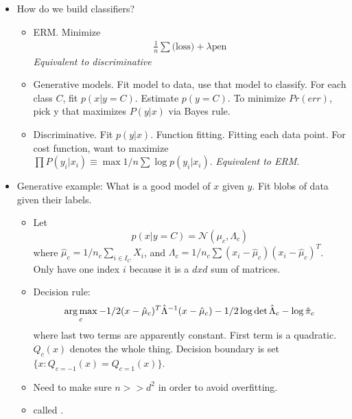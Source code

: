 \documentclass[12pt]{article}
\begin{document}

\begin{itemize}
	\item How do we build classifiers?
	\begin{itemize}
		\item ERM. Minimize 
		\begin{align}
		\frac{1}{n} \sum \text{(loss)} + \lambda \text{pen}
		\end{align}
		\textit{Equivalent to discriminative}
		\item Generative models. Fit model to data, use that model to classify. For each class $C$, fit $p(x|y=C)$. Estimate $p(y=C)$. To minimize $Pr(err)$, pick y that maximizes $P(y|x)$ via Bayes rule. 
		\item Discriminative. Fit $p(y | x)$. Function fitting. Fitting each data point. For cost function, want to maximize $\prod P(y_i|x_i) \equiv \max 1/n \sum \log p(y_i|x_i)$. \textit{Equivalent to ERM}. 
	\end{itemize}
	
	\item Generative example: What is a good model of $x$ given $y$. Fit blobs of data given their labels. 
	\begin{itemize}
		\item Let 
		\begin{equation}
		p(x | y = C) = \mathcal{N} (\mu_c, \Lambda_c)
		\end{equation}
		where $\hat{\mu}_c = 1/n_c \sum_{i \in I_C} X_i$, and $\Lambda_c = 1/n_c \sum (x_i - \hat{\mu}_c)  (x_i - \hat{\mu}_c)^T$. Only have one index $i$ because it is a $dxd$ sum of matrices. 
		\item Decision rule: 
		\begin{align}
		\operatorname*{arg\,max}_c -1/2 (x - \hat{\mu}_c)^T \hat{\Lambda}^{-1} (x - \hat{\mu}_c) - 1/2 \log \det \hat{\Lambda}_c - \log \hat{\pi}_c 
		\end{align}
		where last two terms are apparently constant. First term is a quadratic. $Q_c(x)$ denotes the whole thing. Decision boundary is set $\{ x : Q_{c = -1} (x) = Q_{c = 1} (x) \}$. 
		\item Need to make sure $n >> d^2$ in order to avoid overfitting.
		\item called . 
	\end{itemize}
	

\end{itemize}
\end{document}
